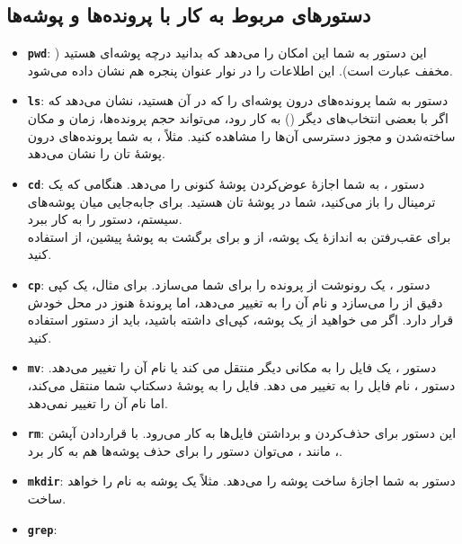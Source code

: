 \subsection{دستورهای مربوط به کار با پرونده‌ها و پوشه‌ها}
\begin{itemize}
\item \textbf{\texttt{\Large pwd}}: این دستور به شما این امکان را می‌دهد که بدانید درچه پوشه‌ای هستید ( مخفف عبارت  است).  این اطلاعات را در نوار عنوان پنجره هم نشان داده می‌شود.

\item \textbf{\texttt{\Large ls}}: دستور  به شما پرونده‌های درون پوشه‌ای را که در آن هستید، نشان می‌دهد که اگر با بعضی انتخاب‌های دیگر () به کار رود، می‌تواند حجم پرونده‌ها، زمان و مکان ساخته‌شدن و مجوز دسترسی آن‌ها را مشاهده کنید. مثلاً ، به شما پرونده‌های درون پوشهٔ تان را نشان می‌دهد.

\item \textbf{\texttt{\Large cd}}: دستور ، به شما اجازهٔ عوض‌کردن پوشهٔ کنونی را می‌دهد. هنگامی که یک ترمینال را باز می‌کنید، شما در پوشهٔ تان هستید. برای جابه‌جایی میان پوشه‌های سیستم، دستور  را به کار ببرد.\\
برای عقب‌رفتن به اندازهٔ یک پوشه، از  و برای برگشت به پوشهٔ پیشین، از  استفاده کنید.

\item \textbf{\texttt{\Large cp}}: دستور ، یک رونوشت از پرونده را برای شما می‌سازد. برای مثال،  یک کپی دقیق از  را می‌سازد و نام آن را به  تغییر می‌دهد، اما پروندهٔ  هنوز در محل خودش قرار دارد. اگر می خواهید از یک پوشه، کپی‌ای داشته باشید، باید از دستور  استفاده کنید.

\item \textbf{\texttt{\Large mv}}: دستور ، یک فایل را به مکانی دیگر منتقل می کند یا نام آن را تغییر می‌دهد. دستور ، نام فایل  را به  تغییر می دهد.  فایل  را به پوشهٔ دسکتاپ شما منتقل می‌کند، اما نام آن را تغییر نمی‌دهد.

\item \textbf{\texttt{\Large rm}}: این دستور برای حذف‌کردن و برداشتن فایل‌ها به کار می‌رود. با قراردادن آپشن ، مانند ، می‌توان دستور را برای حذف پوشه‌ها هم به کار برد.

\item \textbf{\texttt{\Large mkdir}}: دستور  به شما اجازهٔ ساخت پوشه را می‌دهد. مثلاً  یک پوشه به نام  را خواهد ساخت.

\item \textbf{\texttt{\Large grep}}:
\end{itemize}

